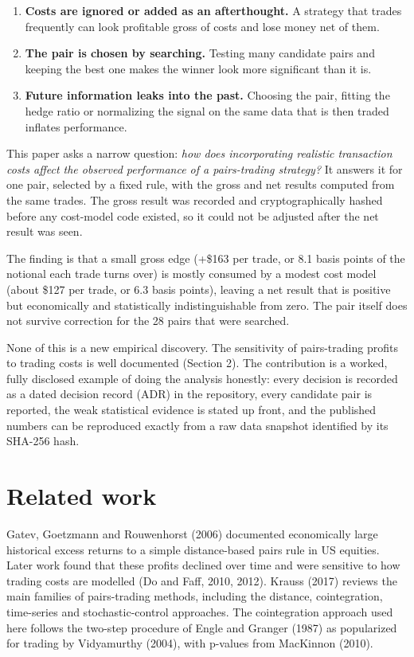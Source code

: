 \documentclass[11pt]{article}
\providecommand{\tightlist}{\setlength{\itemsep}{0pt}\setlength{\parskip}{0pt}}
\begin{document}
\begin{enumerate}
\def\labelenumi{\arabic{enumi}.}
\tightlist
\item
  \textbf{Costs are ignored or added as an afterthought.} A strategy that
  trades frequently can look profitable gross of costs and lose money
  net of them.
\item
  \textbf{The pair is chosen by searching.} Testing many candidate pairs and
  keeping the best one makes the winner look more significant than it is.
\item
  \textbf{Future information leaks into the past.} Choosing the pair, fitting
  the hedge ratio or normalizing the signal on the same data that is then
  traded inflates performance.
\end{enumerate}

This paper asks a narrow question: \emph{how does incorporating realistic
transaction costs affect the observed performance of a pairs-trading
strategy?} It answers it for one pair, selected by a fixed rule, with the
gross and net results computed from the same trades. The gross result was
recorded and cryptographically hashed before any cost-model code existed,
so it could not be adjusted after the net result was seen.

The finding is that a small gross edge (+\$163 per trade, or 8.1 basis
points of the notional each trade turns over) is mostly consumed by a
modest cost model (about \$127 per trade, or 6.3 basis points), leaving a
net result that is positive but economically and statistically
indistinguishable from zero. The pair itself does not survive correction
for the 28 pairs that were searched.

None of this is a new empirical discovery. The sensitivity of pairs-trading
profits to trading costs is well documented (Section 2). The contribution
is a worked, fully disclosed example of doing the analysis honestly: every
decision is recorded as a dated decision record (ADR) in the repository,
every candidate pair is reported, the weak statistical evidence is stated
up front, and the published numbers can be reproduced exactly from a raw
data snapshot identified by its SHA-256 hash.

\hypertarget{related-work}{%
\section{Related work}\label{related-work}}

Gatev, Goetzmann and Rouwenhorst (2006) documented economically large
historical excess returns to a simple distance-based pairs rule in US
equities. Later work found that these profits declined over time and were
sensitive to how trading costs are modelled (Do and Faff, 2010, 2012).
Krauss (2017) reviews the main families of pairs-trading methods,
including the distance, cointegration, time-series and stochastic-control
approaches. The cointegration approach used here follows the two-step
procedure of Engle and Granger (1987) as popularized for trading by
Vidyamurthy (2004), with p-values from MacKinnon (2010).
\end{document}
